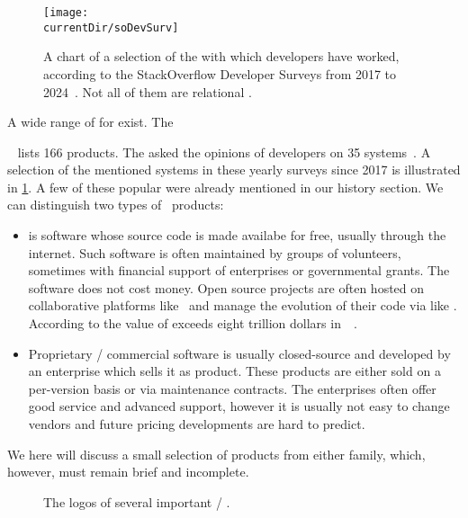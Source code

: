 %
\label{sec:software}%
\FloatBarrier%
%
\begin{figure}%
\centering%
\texttt{[image: \\currentDir/soDevSurv]}%
\caption{A chart of a selection of the  with which developers have worked, according to the StackOverflow Developer Surveys from 2017 to 2024~\cite{SE:SO:2024DS}. %
Not all of them are relational .}%
\label{fig:soDevSurv}%
\end{figure}%
%
A wide range of  for  exist.
The \begin{noglslink}\end{noglslink}~\cite{RS2025DERORD} lists 166 products.
The  asked the opinions of developers on 35 systems~\cite{SE:SO:2024DS}.
A selection of the mentioned systems in these yearly surveys since 2017 is illustrated in \cref{fig:soDevSurv}.
A few of these popular  were already mentioned in our history section.
We can distinguish two types of \db\ products:%
\begin{itemize}%
%
\item {} is software whose source code is made availabe for free, usually through the internet.
Such software is often maintained by groups of volunteers, sometimes with financial support of enterprises or governmental grants.
The software does not cost money.
Open source projects are often hosted on collaborative platforms like \github\ and manage the evolution of their code via  like \git.
According to \citeauthor{HNZ2024TVOOSS} the value of  exceeds eight trillion dollars in~\citeyear{HNZ2024TVOOSS}~\cite{HNZ2024TVOOSS}.
%
\item Proprietary / commercial software is usually closed-source and developed by an enterprise which sells it as product.
These products are either sold on a per-version basis or via maintenance contracts.
The enterprises often offer good service and advanced support, however it is usually not easy to change vendors and future pricing developments are hard to predict.%
%
\end{itemize}%
%
We here will discuss a small selection of products from either family, which, however, must remain brief and incomplete.%
%
%
\begin{figure}%
\centering%
%
%
%
\floatSep%
%
%
%
\floatSep%
%
%
%
\floatRowSep%
%
%
%
\caption{The logos of several important  / .}%
\label{fig:ossDBlogos}%
%
\end{figure}%
